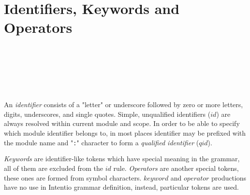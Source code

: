 \section{Identifiers, Keywords and Operators}

\begin{bnf}
    \eq {} \\
   \eq {} \ \term{:} \  \\
  \\
   \eq
        \gor   {}
        \gor   {}
        \gor   {}
        \gor   {}
        \gor   {}
        \gor   {}
        \gorln {}
        \gor   {}
        \gor   {}
        \gor   {}
        \gor   {}
        \gor   {}
        \gor   {}
        \gor   {}
        \gorln {}
        \gor   {}
        \gor   {}
        \gor   {}
        \gor   {}
        \gor   {}
        \gor   {}
        \gorln {}
        \gor   {}
        \gor   {}
        \gor   {}
        \gor   \term{\_} \\
  \\
   \eq
                \term{+}
         \gor   \term{-}
         \gor   \term{*}
         \gor   \term{/}
         \gorln \term{(}
         \gor   \term{)}
         \gor   \term{[}
         \gor   \term{]}
         \gor   \term{\{}
         \gor   \term{\}}
         \gor   \term{;}
         \gorln \term{==}
         \gor   \term{<}
         \gor   \term{<=}
         \gor   \term{>}
         \gor   \term{>=}
         \gor   \term{===}
         \gor   \term{!==}
         \gorln \term{=}
\end{bnf}

An \emph{identifier} consists of a "letter" or underscore followed by zero or more letters, digits, underscores, and single quotes. Simple, unqualified identifiers (\(id\)) are always resolved within current module and scope. In order to be able to specify which module identifier belongs to, in most places identifier may be prefixed with the module name and "\texttt{:}" character to form a \emph{qualified identifier} (\(qid\)).

\emph{Keywords} are identifier-like tokens which have special meaning in the grammar, all of them are excluded from the \(id\) rule. \emph{Operators} are another special tokens, these ones are formed from symbol characters. \(keyword\) and \(operator\) productions have no use in Intentio grammar definition, instead, particular tokens are used.

